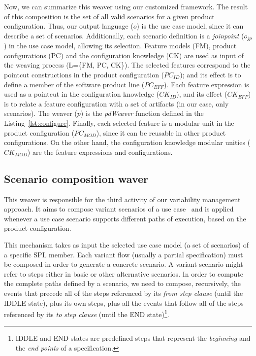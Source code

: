 \documentclass{llncs}
\begin{document}
Now, we can summarize this weaver using our customized framework. The
result of this composition is the set of all valid scenarios for a
given product configuration. Thus, our output language ($o$) is the
use case model, since it can describe a set of scenarios.
Additionally, each scenario definition is a \emph{joinpoint}
($o_{jp}$) in the use case model, allowing its selection. Feature models (FM),
product configurations (PC) and the configuration knowledge (CK) are used
as input of the weaving process (L=\{FM, PC, CK\}). 
The selected features correspond to the pointcut constructions in the 
product configuration ($PC_{ID}$); and
its effect is to define a member of the software product
line ($PC_{EFF}$). Each feature expression is used as a pointcut in
the configuration knowledge ($CK_{ID}$), and its effect ($CK_{EFF}$) is to relate
a feature configuration with a set of artifacts (in our case, only
scenarios). The weaver ($p$) is the \emph{pdWeaver}
function defined in the Listing~\ref{lst:configure}. Finally, each
selected feature is a modular unit in the product configuration
($PC_{MOD}$), since it can be reusable in other product
configurations. On the other hand, the configuration knowledge
modular unities ($CK_{MOD}$) are the feature expressions and
configurations.


\subsection{Scenario composition waver}\label{sub:sc-weaver}

This weaver is responsible for the third activity of our variability management 
approach. It aims to compose variant scenarios of a use case~\cite{gcabral-sbmf-2006} and 
is applied whenever a use case scenario supports different paths of execution, based on the product configuration.

This mechanism takes as
input the selected use case model (a set of scenarios) of a specific SPL member.
Each variant flow (usually a partial specification) must be composed 
in order to generate a concrete scenario. A variant scenario 
might refer to steps either in basic or other alternative scenarios. In order
to compute the complete paths defined by a scenario, we need to compose,
recursively, the events that precede all of the steps referenced by its \emph{from step
clause} (until the IDDLE state), plus its own steps, plus all the
events that follow all of the steps referenced by its \emph{to step clause} (until the END
state)\footnote{IDDLE and END states are predefined steps that
represent the \emph{beginning} and the \emph{end points} of a
specification.}. 
\end{document}
